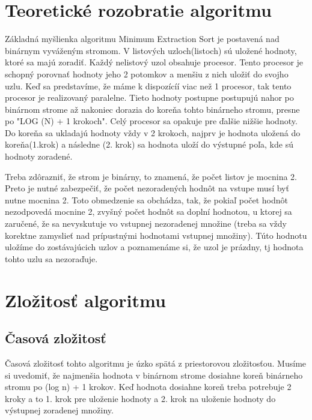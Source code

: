 \documentclass[12pt,a4paper,titlepage,final]{article}
\begin{document}

\def\projname{Projekt z predmetu PRL \\ Implementácie algoritmu Minimum extraction sort}



\section{Teoretické rozobratie algoritmu}
Základná myšlienka algoritmu Minimum Extraction Sort je postavená nad binárnym vyváženým stromom. V listových uzloch(listoch) sú uložené hodnoty, ktoré sa majú zoradiť. Každý nelistový uzol obsahuje procesor. Tento procesor je schopný porovnať hodnoty jeho 2 potomkov a menšiu z nich uložiť do svojho uzlu. Keď sa predstavíme, že máme k dispozícíí viac než 1 procesor, tak tento procesor je realizovaný paralelne. Tieto hodnoty postupne postupujú nahor po binárnom strome až nakoniec dorazia do koreňa tohto binárneho stromu, presne po "LOG (N) + 1 krokoch". Celý procesor sa opakuje pre ďalšie nižšie hodnoty. Do koreňa sa ukladajú hodnoty vždy v 2 krokoch, najprv je hodnota uložená do koreňa(1.krok) a následne (2. krok) sa hodnota uloží do výstupné poľa, kde sú hodnoty zoradené.

Treba zdôrazniť, že strom je binárny, to znamená, že počet listov je mocnina 2. Preto je nutné zabezpečiť, že počet nezoradených hodnôt na vstupe musí byť nutne mocnina 2. Toto obmedzenie sa obchádza, tak, že pokiaľ počet hodnôt nezodpovedá mocnine 2, zvyšný počet hodnôt sa doplní hodnotou, u ktorej sa zaručené, že sa nevyskutuje vo vstupnej nezoradenej množine (treba sa vždy korektne zamyslieť nad prípustnými hodnotami vstupnej množiny). Túto hodnotu uložíme do zostávajúcich uzlov a poznamenáme si, že uzol je prázdny, tj hodnota tohto uzlu sa nezoraďuje.


\section{Zložitosť algoritmu}
\subsection{Časová zložitosť}
Časová zložitosť tohto algoritmu je úzko spätá z priestorovou zložitosťou. Musíme si uvedomiť, že najmenšia hodnota v binárnom strome dosiahne koreň binárneho stromu po (log n) + 1 krokov. Keď hodnota dosiahne koreň treba potrebuje 2 kroky a to 1. krok pre uloženie hodnoty a 2. krok na uloženie hodnoty do výstupnej zoradenej množiny.
\end{document}
